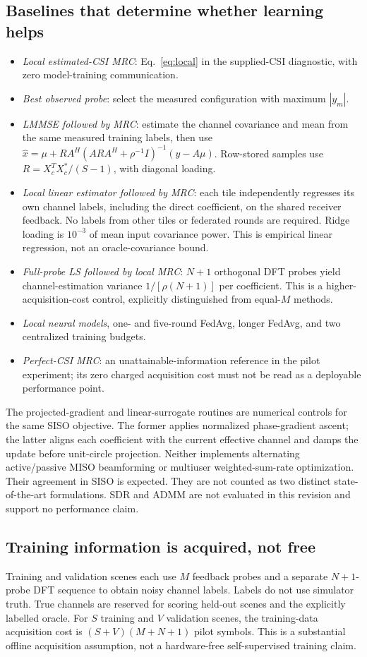 \documentclass[journal]{IEEEtran}
\begin{document}
\subsection{Baselines that determine whether learning helps}
\begin{itemize}
\item \emph{Local estimated-CSI MRC}: Eq.~\eqref{eq:local} in the supplied-CSI diagnostic, with zero model-training communication.
\item \emph{Best observed probe}: select the measured configuration with maximum $|y_m|$.
\item \emph{LMMSE followed by MRC}: estimate the channel covariance and mean from the same measured training labels, then use $\hat x=\mu+RA^H(ARA^H+\rho^{-1}I)^{-1}(y-A\mu)$. Row-stored samples use $R=X_c^TX_c^*/(S-1)$, with diagonal loading.
\item \emph{Local linear estimator followed by MRC}: each tile independently regresses its own channel labels, including the direct coefficient, on the shared receiver feedback. No labels from other tiles or federated rounds are required. Ridge loading is $10^{-3}$ of mean input covariance power. This is empirical linear regression, not an oracle-covariance bound.
\item \emph{Full-probe LS followed by local MRC}: $N+1$ orthogonal DFT probes yield channel-estimation variance $1/[\rho(N+1)]$ per coefficient. This is a higher-acquisition-cost control, explicitly distinguished from equal-$M$ methods.
\item \emph{Local neural models}, one- and five-round FedAvg, longer FedAvg, and two centralized training budgets.
\item \emph{Perfect-CSI MRC}: an unattainable-information reference in the pilot experiment; its zero charged acquisition cost must not be read as a deployable performance point.
\end{itemize}
The projected-gradient and linear-surrogate routines are numerical controls for the same SISO objective. The former applies normalized phase-gradient ascent; the latter aligns each coefficient with the current effective channel and damps the update before unit-circle projection. Neither implements alternating active/passive MISO beamforming or multiuser weighted-sum-rate optimization. Their agreement in SISO is expected. They are not counted as two distinct state-of-the-art formulations. SDR and ADMM are not evaluated in this revision and support no performance claim.

\subsection{Training information is acquired, not free}
Training and validation scenes each use $M$ feedback probes and a separate $N+1$-probe DFT sequence to obtain noisy channel labels. Labels do not use simulator truth. True channels are reserved for scoring held-out scenes and the explicitly labelled oracle. For $S$ training and $V$ validation scenes, the training-data acquisition cost is $(S+V)(M+N+1)$ pilot symbols. This is a substantial offline acquisition assumption, not a hardware-free self-supervised training claim.
\end{document}

